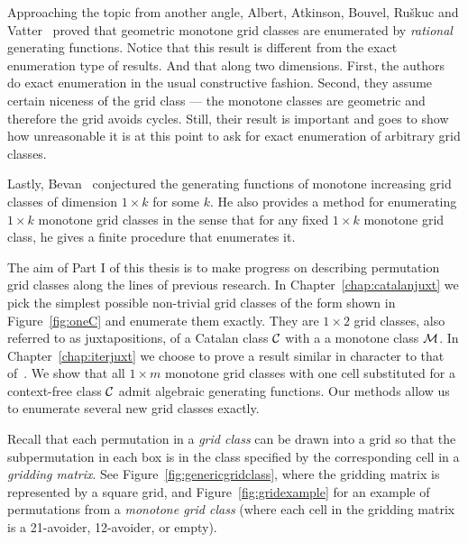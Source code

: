 \documentclass[12pt, a4paper, twoside]{report}
\begin{document}
Approaching the topic from another angle, Albert, Atkinson, Bouvel, Ru\v{s}kuc and Vatter~\cite{aabrv2013} proved that geometric monotone grid classes are enumerated by \emph{rational} generating functions. Notice that this result is different from the exact enumeration type of results. And that along two dimensions. First, the authors do exact enumeration in the usual constructive fashion. Second, they assume certain niceness of the grid class --- the monotone classes are geometric and therefore the grid avoids cycles. Still, their result is important and goes to show how unreasonable it is at this point to ask for exact enumeration of arbitrary grid classes.

Lastly, Bevan~\cite{bevan2015thesis} conjectured the generating functions of monotone increasing grid classes of dimension $1\times k$ for some $k$. He also provides a method for enumerating $1\times k$ monotone grid classes in the sense that for any fixed $1\times k$ monotone grid class, he gives a finite procedure that enumerates it.

The aim of Part I of this thesis is to make progress on describing permutation grid classes along the lines of previous research. In Chapter~\ref{chap:catalanjuxt} we pick the simplest possible non-trivial grid classes of the form shown in Figure~\ref{fig:oneC} and enumerate them exactly. They are $1\times 2$ grid classes, also referred to as juxtapositions, of a Catalan class $\mathcal{C}$ with a a monotone class $\mathcal{M}$. In Chapter~\ref{chap:iterjuxt} we choose to prove a result similar in character to that of~\cite{aabrv2013}. We show that all $1\times m$ monotone grid classes with one cell substituted for a context-free class $\mathcal{C}$ admit algebraic generating functions. Our methods allow us to enumerate several new grid classes exactly.

Recall that each permutation in a \emph{grid class} can be drawn into a grid so that the subpermutation in each box is in the class specified by the corresponding cell in a \emph{gridding matrix}. See Figure~\ref{fig:genericgridclass}, where the gridding matrix is represented by a square grid, and Figure~\ref{fig:gridexample}  for an example of permutations from a \emph{monotone grid class} (where each cell in the gridding matrix is a 21-avoider, 12-avoider, or empty).

\newsavebox{\smlmata}
\newsavebox{\smlmatb}
\end{document}
